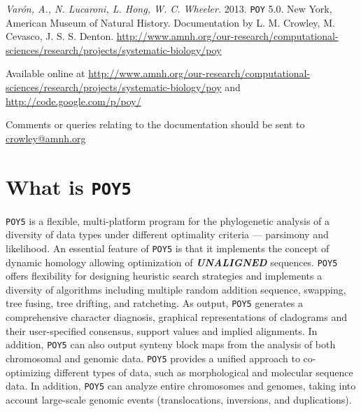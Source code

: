 \documentclass[11pt]{book}
\newcommand{\commandstyle}[1]{\texttt{#1}}
\newcommand{\poy}{\commandstyle{POY5}\xspace}
\begin{document}
\begin{flushleft}
\vspace*{0.25cm}
\emph{Var\'on, A., N. Lucaroni, L. Hong, W. C. Wheeler.} 2013. \texttt{POY} 5.0. New York, 
American Museum of Natural History. Documentation by L. M. Crowley, M. Cevasco, J. S. S. Denton. 
\url{http://www.amnh.org/our-research/computational-sciences/research/projects/systematic-biology/poy}

\vspace*{0.25cm}

Available online at
\url{http://www.amnh.org/our-research/computational-sciences/research/projects/systematic-biology/poy}
and
\url{http://code.google.com/p/poy/} 

Comments or queries relating to the documentation should be sent to \href{mailto:crowley@amnh.org}{crowley@amnh.org}
\end{flushleft}

\newpage

\renewcommand{\cftsecdotsep}{2}
\tableofcontents


\chapter{What is \poy}

\poy is a flexible, multi-platform program for the phylogenetic analysis of a diversity of 
data types under different optimality criteria --- parsimony and likelihood.
An essential feature of \poy is that it implements the concept of dynamic homology 
\cite{wheeler2001a, wheeler2001} allowing optimization of   {\bf \emph{UNALIGNED}} 
sequences. \poy offers flexibility for designing heuristic search strategies and implements 
a diversity of algorithms including multiple random addition sequence, swapping, tree fusing, 
tree drifting, and ratcheting. As output, \poy generates a comprehensive character diagnosis, 
graphical representations of cladograms and their user-specified consensus, support values 
and implied alignments.  In addition, \poy can also output synteny block maps from the 
analysis of both chromosomal and genomic data. \poy provides a unified approach to 
co-optimizing different types of data, such as morphological and molecular sequence data. 
In addition, \poy can analyze entire chromosomes and genomes, taking into account large-scale 
genomic events (translocations, inversions, and duplications).
\end{document}
